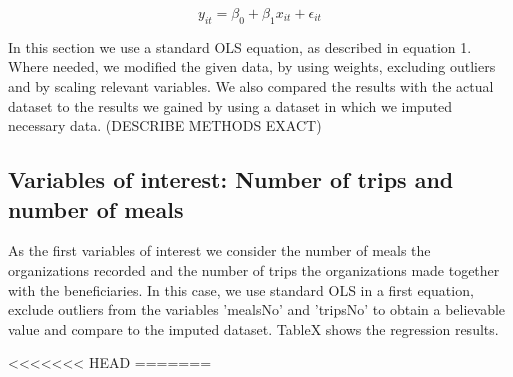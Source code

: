 \documentclass[12pt, a4paper, titlepage]{article}\usepackage[]{graphicx}\usepackage[]{color}
\begin{document}
\begin{equation}
\label{Equation 1}
  y_{it} = \beta_0 + \beta_1 x_{it} + \epsilon_{it}
\end{equation}

In this section we use a standard OLS equation, as described in equation 1. Where needed, we modified the given data, by using weights, excluding outliers and by scaling relevant variables. We also compared the results with the actual dataset to the results we gained by using a dataset in which we imputed necessary data. (DESCRIBE METHODS EXACT) 

\subsection{Variables of interest: Number of trips and number of meals} 

As the first variables of interest we consider the number of meals the organizations recorded and the number of trips the organizations made together with the beneficiaries. In this case, we use standard OLS in a first equation, exclude outliers from the variables 'mealsNo' and 'tripsNo' to obtain a believable value and compare to the imputed dataset. TableX shows the regression results.


<<<<<<< HEAD
=======
\usepackage{booktabs}
\end{document}
